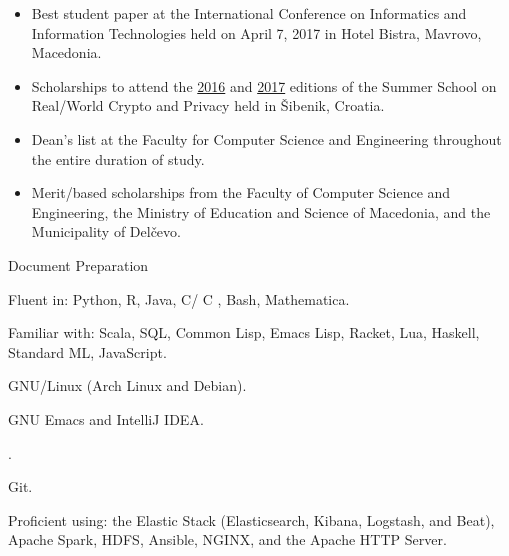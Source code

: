 \documentclass[version=last, paper=A4, DIV=12, toc=bibliography]{scrartcl}%
\newcommand{\CC}{%
  C\nolinebreak%
  \hspace{-.05em}\raisebox{.4ex}{\relsize{-3}{\textbf{+}}}\nolinebreak%
  \hspace{-.10em}\raisebox{.4ex}{\relsize{-3}{\textbf{+}}}%
}%
\begin{document}
\begin{itemize}
\item Best student paper at the  International Conference on Informatics
  and Information Technologies held on April 7, 2017 in Hotel Bistra,
  Mavrovo, Macedonia.
\item Scholarships to attend the
  \href{http://summerschool-croatia.cs.ru.nl/2016/}{2016} and
  \href{http://summerschool-croatia.cs.ru.nl/2017/}{2017} editions of the Summer
  School on Real\-/World Crypto and Privacy held in Šibenik, Croatia.
\item Dean's list at the \textsf{Faculty for Computer Science and Engineering}
  throughout the entire duration of study.
\item Merit\-/based scholarships from the \textsf{Faculty of Computer Science
    and Engineering}, the \textsf{Ministry of Education and Science of
    Macedonia}, and the \textsf{Municipality of Delčevo}.
\end{itemize}


\begingroup
{}
\begin{labeling}[~--]{Document Preparation}
\item[Programming] Fluent in: Python, R, Java, C/\CC, Bash,
  Mathematica\textsuperscript{\textregistered}.

  Familiar with: Scala, SQL, Common Lisp, Emacs Lisp, Racket, Lua, Haskell,
  Standard ML, JavaScript.
\item[Operating Systems] GNU/Linux (Arch Linux and Debian).
\item[Text Editors/IDEs] GNU Emacs and IntelliJ IDEA\@.
\item[Document Preparation] .
\item[Version Control] Git.
\item[Miscellaneous] Proficient using: the Elastic Stack (Elasticsearch, Kibana,
  Logstash, and Beat), Apache Spark, HDFS, Ansible, NGINX, and the Apache HTTP
  Server.
\end{labeling}
\endgroup

\printbibliography[title=Publications]
\end{document}
